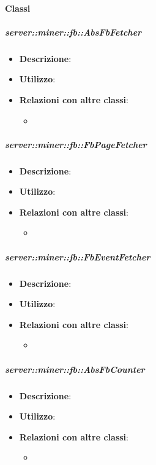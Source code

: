 	\paragraph{Classi} %
		\subparagraph{server::miner::fb::AbsFbFetcher} %
		\label{subp:server_miner_fb_AbsFbFetcher}
			\begin{itemize}
				\item \textbf{Descrizione}:
				\item \textbf{Utilizzo}: 
				\item \textbf{Relazioni con altre classi}:
					\begin{itemize}
						\item 
					\end{itemize}
			\end{itemize}
	
		\subparagraph{server::miner::fb::FbPageFetcher} %
		\label{subp:server_miner_fb_FbPageFetcher}
			\begin{itemize}
				\item \textbf{Descrizione}:
				\item \textbf{Utilizzo}: 
				\item \textbf{Relazioni con altre classi}:
					\begin{itemize}
						\item 
					\end{itemize}
			\end{itemize}
	
		\subparagraph{server::miner::fb::FbEventFetcher} %
		\label{subp:server_miner_fb_FbEventFetcher}
			\begin{itemize}
				\item \textbf{Descrizione}:
				\item \textbf{Utilizzo}: 
				\item \textbf{Relazioni con altre classi}:
					\begin{itemize}
						\item 
					\end{itemize}
			\end{itemize}
	
		\subparagraph{server::miner::fb::AbsFbCounter} %
		\label{subp:server_miner_fb_AbsFbCounter}
			\begin{itemize}
				\item \textbf{Descrizione}:
				\item \textbf{Utilizzo}: 
				\item \textbf{Relazioni con altre classi}:
					\begin{itemize}
						\item 
					\end{itemize}
			\end{itemize}
	
